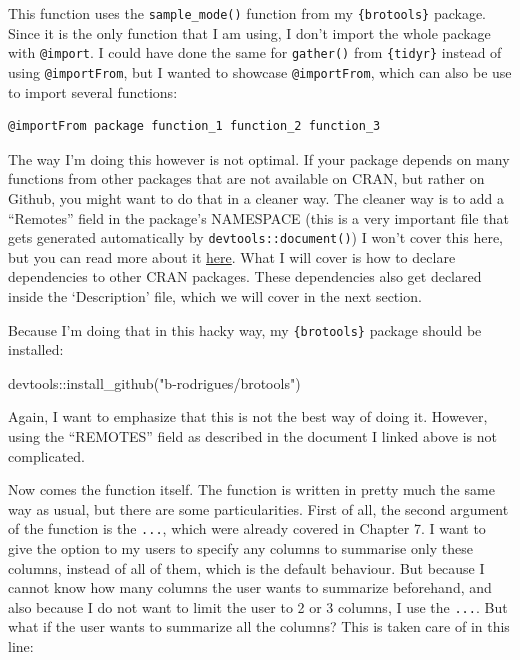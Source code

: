 \documentclass[
]{article}
\newenvironment{Shaded}{\begin{snugshade}}{\end{snugshade}}
\newcommand{\FunctionTok}[1]{\textcolor[rgb]{0.00,0.00,0.00}{#1}}
\newcommand{\NormalTok}[1]{#1}
\newcommand{\SpecialCharTok}[1]{\textcolor[rgb]{0.00,0.00,0.00}{#1}}
\newcommand{\StringTok}[1]{\textcolor[rgb]{0.31,0.60,0.02}{#1}}
\begin{document}
This function uses the \texttt{sample\_mode()} function from my \texttt{\{brotools\}} package. Since it is the only
function that I am using, I don't import the whole package with \texttt{@import}. I could have done the
same for \texttt{gather()} from \texttt{\{tidyr\}} instead of using \texttt{@importFrom}, but I wanted to showcase
\texttt{@importFrom}, which can also be use to import several functions:

\begin{verbatim}
@importFrom package function_1 function_2 function_3
\end{verbatim}

The way I'm doing this however is not optimal. If your package depends on many functions from
other packages that are not available on CRAN, but rather on Github, you might want to do that
in a cleaner way. The cleaner way is to add a ``Remotes'' field in the package's NAMESPACE (this is
a very important file that gets generated automatically by \texttt{devtools::document()}) I won't
cover this here, but you can read more about it \href{https://cran.r-project.org/web/packages/devtools/vignettes/dependencies.html}{here}.
What I will cover is how to declare dependencies to other CRAN packages. These dependencies also
get declared inside the `Description' file, which we will cover in the next section.

Because I'm doing that in this hacky way, my \texttt{\{brotools\}} package should be installed:

\begin{Shaded}
\begin{Highlighting}[]
\NormalTok{devtools}\SpecialCharTok{::}\FunctionTok{install\_github}\NormalTok{(}\StringTok{"b{-}rodrigues/brotools"}\NormalTok{)}
\end{Highlighting}
\end{Shaded}

Again, I want to emphasize that this is not the best way of doing it. However, using the ``REMOTES''
field as described in the document I linked above is not complicated.

Now comes the function itself. The function is written in pretty much the same way as usual, but
there are some particularities. First of all, the second argument of the function is the \texttt{...}, which
were already covered in Chapter 7. I want to give the option to my users to specify any columns to
summarise only these columns, instead of all of them, which is the default behaviour. But because
I cannot know how many columns the user wants to summarize beforehand, and also because I do not
want to limit the user to 2 or 3 columns, I use the \texttt{...}.
But what if the user wants to summarize all the columns? This is taken care of in this line:
\end{document}
